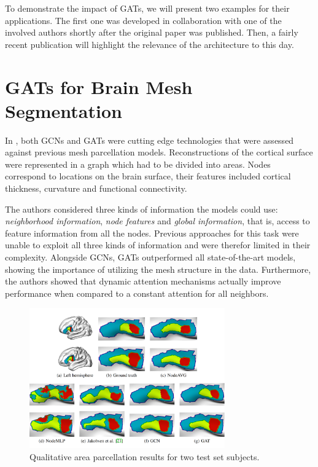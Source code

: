 \label{chapter:applications}

To demonstrate the impact of GATs, we will present two examples for their applications. The first one was developed in collaboration with one of the involved authors shortly after the original paper was published. Then, a fairly recent publication will highlight the relevance of the architecture to this day.

\section*{GATs for Brain Mesh Segmentation}
In \cite{Cucurull2018ConvolutionalNN}, both GCNs and GATs were cutting edge technologies that were assessed against previous mesh parcellation models. Reconstructions of the cortical surface were represented in a graph which had to be divided into areas. Nodes correspond to locations on the brain surface, their features included cortical thickness, curvature and functional connectivity.

The authors considered three kinds of information the models could use: \textit{neighborhood information}, \textit{node features} and \textit{global information}, that is, access to feature information from all the nodes.
Previous approaches for this task were unable to exploit all three kinds of information and were therefor limited in their complexity. Alongside GCNs, GATs outperformed all state-of-the-art models, showing the importance of utilizing the mesh structure in the data. Furthermore, the authors showed that dynamic attention mechanisms actually improve performance when compared to a constant attention for all neighbors.

\begin{figure}[h]
    \centering
    \includegraphics[width=0.75\textwidth]{img/brain_mesh.PNG}
    \caption{Qualitative area parcellation results for two test set subjects. \cite{Cucurull2018ConvolutionalNN}}
\end{figure}

